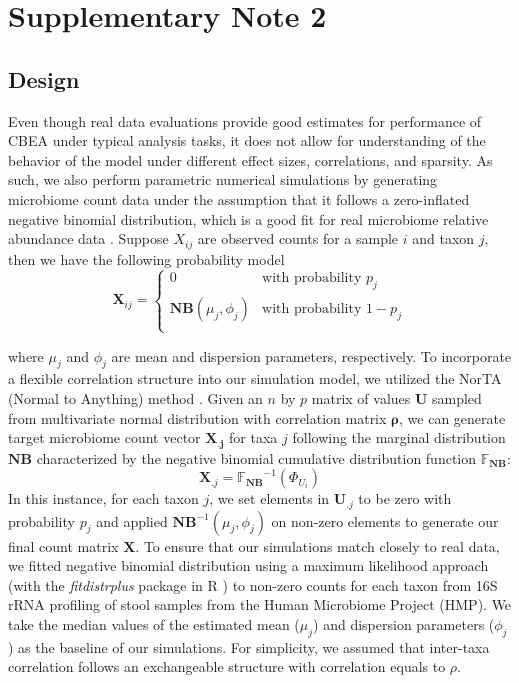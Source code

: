 \section{Supplementary Note 2} \label{appC_note2}
\subsection{Design}
Even though real data evaluations provide good estimates for performance of CBEA under typical analysis tasks, it does not allow for understanding of the behavior of the model under different effect sizes, correlations, and sparsity. As such, we also perform parametric numerical simulations by generating microbiome count data under the assumption that it follows a zero-inflated negative binomial distribution, which is a good fit for real microbiome relative abundance data \cite{calgaro2020assessment}. Suppose $X_{ij}$ are observed counts for a sample $i$ and taxon $j$, then we have the following probability model
\begin{equation}
    \mathbf{X}_{ij} =
      \begin{cases}
        0 & \text{with probability $p_j$}\\
        \mathbf{NB}(\mu_j, \phi_j) & \text{with probability $1 - p_j$}\\
      \end{cases}       
\end{equation}

where $\mu_j$ and $\phi_j$ are mean and dispersion parameters, respectively. To incorporate a flexible correlation structure into our simulation model, we utilized the NorTA (Normal to Anything) method \cite{cario1997modeling}. Given an $n$ by $p$ matrix of values $\mathbf{U}$ sampled from multivariate normal distribution with correlation matrix $\mathbf{\rho}$, we can generate target microbiome count vector $\mathbf{X_{.j}}$ for taxa $j$ following the marginal distribution $\mathbf{NB}$ characterized by the negative binomial cumulative distribution function $\mathbb{F_{\mathbf{NB}}}$:
\begin{equation}
    \mathbf{X}_{.j} = \mathbb{F_{\mathbf{NB}}}^{-1}(\Phi_{U_i})
\end{equation}
In this instance, for each taxon $j$, we set elements in $\mathbf{U}_{.j}$ to be zero with probability $p_j$ and applied $\mathbf{NB}^{-1}(\mu_j, \phi_j)$ on non-zero elements to generate our final count matrix $\mathbf{X}$. To ensure that our simulations match closely to real data, we fitted negative binomial distribution using a maximum likelihood approach (with the \emph{fitdistrplus} package in R \cite{delignette-muller2015fitdistrplus}) to non-zero counts for each taxon from 16S rRNA profiling of stool samples from the Human Microbiome Project (HMP). We take the median values of the estimated mean ($\mu_j$) and dispersion parameters ($\phi_j$) as the baseline of our simulations. For simplicity, we assumed that inter-taxa correlation follows an exchangeable structure with correlation equals to $\rho$.

